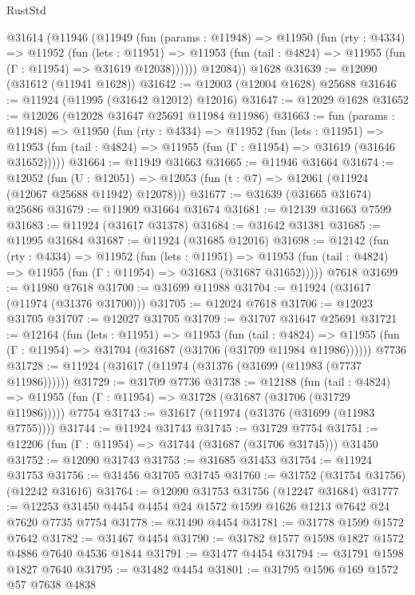 \begin{lexlean}{RustStd}
\begin{coremodule}
    @31614
      (@11946
        (@11949
          (fun (params : @11948) =>
          @11950
            (fun (rty : @4334) =>
            @11952
              (fun (lets : @11951) =>
              @11953 (fun (tail : @4824) => @11955 (fun (Γ : @11954) => @31619 @12038))))))
        @12084))
    @1628
@31639 := @12090 (@31612 (@11941 @1628))
@31642 := @12003 (@12004 @1628) @25688
@31646 := @11924 (@11995 (@31642 @12012) @12016)
@31647 := @12029 @1628
@31652 := @12026 (@12028 @31647 @25691 @11984 @11986)
@31663 := fun (params : @11948) =>
  @11950
    (fun (rty : @4334) =>
    @11952
      (fun (lets : @11951) =>
      @11953 (fun (tail : @4824) => @11955 (fun (Γ : @11954) => @31619 (@31646 @31652)))))
@31664 := @11949 @31663
@31665 := @11946 @31664
@31674 := @12052
    (fun (U : @12051) => @12053 (fun (t : @7) => @12061 (@11924 (@12067 @25688 @11942) @12078)))
@31677 := @31639 (@31665 @31674) @25686
@31679 := @11909 @31664 @31674
@31681 := @12139 @31663 @7599
@31683 := @11924 (@31617 @31378)
@31684 := @31642 @31381
@31685 := @11995 @31684
@31687 := @11924 (@31685 @12016)
@31698 := @12142
    (fun (rty : @4334) =>
    @11952
      (fun (lets : @11951) =>
      @11953 (fun (tail : @4824) => @11955 (fun (Γ : @11954) => @31683 (@31687 @31652)))))
    @7618
@31699 := @11980 @7618
@31700 := @31699 @11988
@31704 := @11924 (@31617 (@11974 (@31376 @31700)))
@31705 := @12024 @7618
@31706 := @12023 @31705
@31707 := @12027 @31705
@31709 := @31707 @31647 @25691
@31721 := @12164
    (fun (lets : @11951) =>
    @11953
      (fun (tail : @4824) =>
      @11955 (fun (Γ : @11954) => @31704 (@31687 (@31706 (@31709 @11984 @11986))))))
    @7736
@31728 := @11924 (@31617 (@11974 (@31376 (@31699 (@11983 (@7737 @11986))))))
@31729 := @31709 @7736
@31738 := @12188
    (fun (tail : @4824) => @11955 (fun (Γ : @11954) => @31728 (@31687 (@31706 (@31729 @11986)))))
    @7754
@31743 := @31617 (@11974 (@31376 (@31699 (@11983 @7755))))
@31744 := @11924 @31743
@31745 := @31729 @7754
@31751 := @12206 (fun (Γ : @11954) => @31744 (@31687 (@31706 @31745))) @31450
@31752 := @12090 @31743
@31753 := @31685 @31453
@31754 := @11924 @31753
@31756 := @31456 @31705 @31745
@31760 := @31752 (@31754 @31756) (@12242 @31616)
@31764 := @12090 @31753 @31756 (@12247 @31684)
@31777 := @12253 @31450 @4454 @4454 @24 @1572 @1599 @1626 @1213 @7642 @24 @7620 @7735 @7754
@31778 := @31490 @4454
@31781 := @31778 @1599 @1572 @7642
@31782 := @31467 @4454
@31790 := @31782 @1577 @1598 @1827 @1572 @4886 @7640 @4536 @1844
@31791 := @31477 @4454
@31794 := @31791 @1598 @1827 @7640
@31795 := @31482 @4454
@31801 := @31795 @1596 @169 @1572 @57 @7638 @4838

\end{coremodule}
\end{lexlean}
